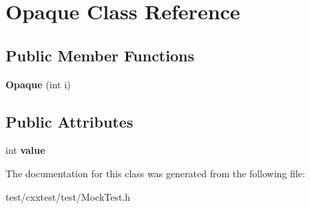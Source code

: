 \hypertarget{classOpaque}{\section{Opaque Class Reference}
\label{classOpaque}
}
\subsection*{Public Member Functions}
\begin{DoxyCompactItemize}
\item 
\hypertarget{classOpaque_ae028da4e7e2e2b9bb9a7bf26bd426069}{{\bfseries Opaque} (int i)}\label{classOpaque_ae028da4e7e2e2b9bb9a7bf26bd426069}

\end{DoxyCompactItemize}
\subsection*{Public Attributes}
\begin{DoxyCompactItemize}
\item 
\hypertarget{classOpaque_abf08babce2f42c42cf4c4f9889dd0c3c}{int {\bfseries value}}\label{classOpaque_abf08babce2f42c42cf4c4f9889dd0c3c}

\end{DoxyCompactItemize}


The documentation for this class was generated from the following file\-:\begin{DoxyCompactItemize}
\item 
test/cxxtest/test/Mock\-Test.\-h\end{DoxyCompactItemize}
